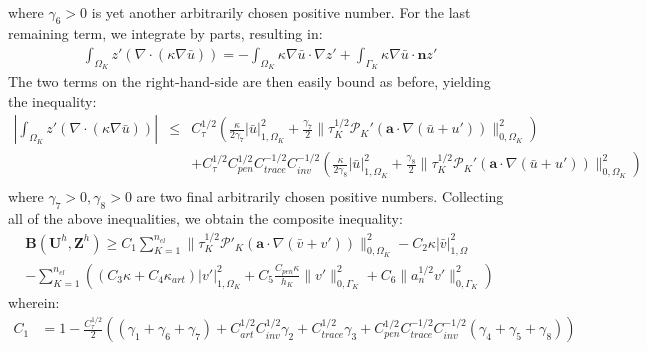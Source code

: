 \documentclass[11pt]{article}
\newenvironment{proof}[1][Proof]{\begin{trivlist}
\item[\hskip \labelsep {\bfseries #1}]}{\end{trivlist}}
\begin{document}
\begin{proof}
\begin{eqnarray}
\end{eqnarray}
where $\gamma_6 > 0$ is yet another arbitrarily chosen positive number.  For the last remaining term, we integrate by parts, resulting in:
\begin{eqnarray}
\int_{\Omega_K} z' \left(\nabla \cdot \left( \kappa \nabla \bar{u} \right) \right) = - \int_{\Omega_K} \kappa \nabla \bar{u} \cdot \nabla z' + \int_{\Gamma_K} \kappa \nabla \bar{u} \cdot \bm{n} z'
\end{eqnarray}
The two terms on the right-hand-side are then easily bound as before, yielding the inequality:
\begin{eqnarray}
\left| \int_{\Omega_K} z' \left(\nabla \cdot \left( \kappa \nabla \bar{u} \right) \right) \right| & \leq & C^{1/2}_{\tau} \left( \frac{\kappa}{2\gamma_7} | \bar{u} |_{1,\Omega_K}^2 + \frac{\gamma_7}{2} \| \tau^{1/2}_K \mathcal{P}_K' \left( \bm{a} \cdot \nabla \left( \bar{u} + u' \right) \right) \|_{0,\Omega_K}^2 \right) \nonumber \\
&& + C^{1/2}_{\tau} C^{1/2}_{pen} C^{-1/2}_{trace} C^{-1/2}_{inv} \left( \frac{\kappa}{2\gamma_8} | \bar{u} |_{1,\Omega_K}^2 + \frac{\gamma_8}{2} \| \tau^{1/2}_K \mathcal{P}_K' \left( \bm{a} \cdot \nabla \left( \bar{u} + u' \right) \right) \|_{0,\Omega_K}^2 \right) \nonumber \\
\end{eqnarray}
where $\gamma_7 > 0, \gamma_8 > 0$ are two final arbitrarily chosen positive numbers.  Collecting all of the above inequalities, we obtain the composite inequality:
\begin{eqnarray}
\textbf{B}(\textbf{U}^h,\textbf{Z}^h) \geq C_1 \sum_{K=1}^{n_{el}} \| \tau_K^{1/2} \mathcal{P}'_K \left( \bm{a} \cdot \nabla \left(\bar{v} + v'\right) \right) \|^2_{0,\Omega_K} - C_2 \kappa | \bar{v} |^2_{1,\Omega} \nonumber \\ - \sum_{K=1}^{n_{el}} \left( \left( C_3 \kappa + C_4 \kappa_{art} \right) | v' |^2_{1,\Omega_K} + C_5 \frac{C_{pen}\kappa}{h_K} \| v' \|^2_{0,\Gamma_K} + C_6 \| a_n^{1/2} v' \|^2_{0,\Gamma_K} \right) \label{eqn:composite_inequality}
\end{eqnarray}
wherein:
\begin{align}
C_1 &= 1 - \frac{C_{\tau}^{1/2}}{2} \left( \left( \gamma_1 + \gamma_6 + \gamma_7 \right) + C_{art}^{1/2} C_{inv}^{1/2} \gamma_2 + C_{trace}^{1/2} \gamma_3 + C_{pen}^{1/2} C_{trace}^{-1/2} C_{inv}^{-1/2} \left( \gamma_4 + \gamma_5 + \gamma_8 \right) \right) \nonumber
\end{align}
\begin{align}

\end{align}
\end{proof}
\end{document}
